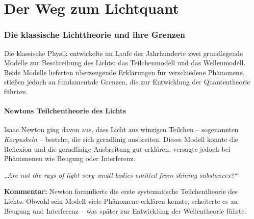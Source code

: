 \chapter{ Der Weg zum Lichtquant}

\setcounter{section}{2}
\setcounter{subsection}{0}
\setcounter{subsubsection}{1}
\setcounter{secnumdepth}{3}

\subsection{Die klassische Lichttheorie und ihre Grenzen}

Die klassische Physik entwickelte im Laufe der Jahrhunderte zwei grundlegende Modelle zur Beschreibung des Lichts: das Teilchenmodell und das Wellenmodell. Beide Modelle lieferten überzeugende Erklärungen für verschiedene Phänomene, stießen jedoch an fundamentale Grenzen, die zur Entwicklung der Quantentheorie führten.

\subsubsection{Newtons Teilchentheorie des Lichts}
Isaac Newton ging davon aus, dass Licht aus winzigen Teilchen – sogenannten \emph{Korpuskeln} – bestehe, die sich geradlinig ausbreiten. Dieses Modell konnte die Reflexion und die geradlinige Ausbreitung gut erklären, versagte jedoch bei Phänomenen wie Beugung oder Interferenz.
\medskip
\begin{tcolorbox}[physikbox, title=Isaac Newton(1704) Teilchentheorie\textit{ \cite{newton_opticks}}]
	\label{box:newton}
	
	\emph{„Are not the rays of light very small bodies emitted from shining substances?“}
	
	\vspace{6pt}
	\textbf{Kommentar:} Newton formulierte die erste systematische Teilchentheorie des Lichts. Obwohl sein Modell viele Phänomene erklären konnte, scheiterte es an Beugung und Interferenz – was später zur Entwicklung der Wellentheorie führte.
\end{tcolorbox}
